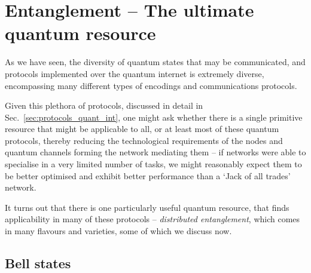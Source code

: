 %
%

\section{Entanglement -- The ultimate quantum resource} \label{sec:ent_ultimate} 

As we have seen, the diversity of quantum states that may be communicated, and protocols implemented over the quantum internet is extremely diverse, encompassing many different types of encodings and communications protocols.

Given this plethora of protocols, discussed in detail in Sec.~\ref{sec:protocols_quant_int}, one might ask whether there is a single primitive resource that might be applicable to all, or at least most of these quantum protocols, thereby reducing the technological requirements of the nodes and quantum channels forming the network mediating them -- if networks were able to specialise in a very limited number of tasks, we might reasonably expect them to be better optimised and exhibit better performance than a `Jack of all trades' network.

It turns out that there is one particularly useful quantum resource, that finds applicability in many of these protocols -- \textit{distributed entanglement}, which comes in many flavours and varieties, some of which we discuss now.

%
%

\subsection{Bell states}

